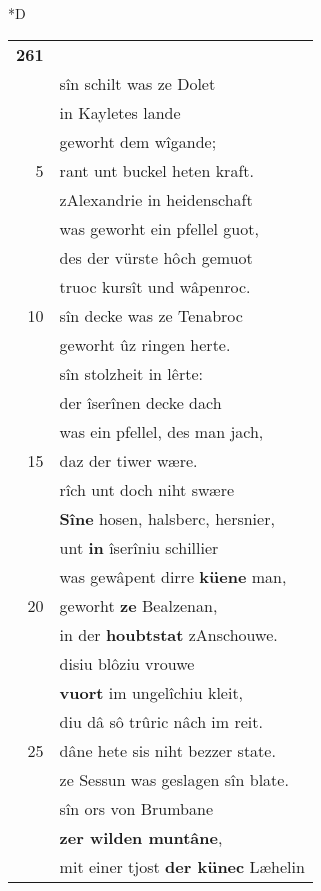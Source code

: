 \documentclass[8pt,a4paper,notitlepage]{article}
\begin{document}
\begin{table}[ht]
\begin{minipage}[t]{0.5\linewidth}
\small
\begin{center}*D
\end{center}
\begin{tabular}{rl}
\textbf{261} & \textbf{\begin{large}E\end{large}inen} helm worhte Trebuchet.\\ 
 & sîn schilt was ze Dolet\\ 
 & in Kayletes lande\\ 
 & geworht dem wîgande;\\ 
5 & rant unt buckel heten kraft.\\ 
 & zAlexandrie in heidenschaft\\ 
 & was geworht ein pfellel guot,\\ 
 & des der vürste hôch gemuot\\ 
 & truoc kursît und wâpenroc.\\ 
10 & sîn decke was ze Tenabroc\\ 
 & geworht ûz ringen herte.\\ 
 & sîn stolzheit in lêrte:\\ 
 & der îserînen decke dach\\ 
 & was ein pfellel, des man jach,\\ 
15 & daz der tiwer wære.\\ 
 & rîch unt doch niht swære\\ 
 & \textbf{Sîne} hosen, halsberc, hersnier,\\ 
 & unt \textbf{in} îserîniu schillier\\ 
 & was gewâpent dirre \textbf{küene} man,\\ 
20 & geworht \textbf{ze} Bealzenan,\\ 
 & in der \textbf{houbtstat} zAnschouwe.\\ 
 & disiu blôziu vrouwe\\ 
 & \textbf{vuort} im ungelîchiu kleit,\\ 
 & diu dâ sô trûric nâch im reit.\\ 
25 & dâne hete sis niht bezzer state.\\ 
 & ze Sessun was geslagen sîn blate.\\ 
 & sîn ors von Brumbane\\ 
 & \textbf{zer wilden muntâne},\\ 
 & mit einer tjost \textbf{der künec} Læhelin\\ 

\end{tabular}
\end{minipage}
\end{table}
\end{document}
